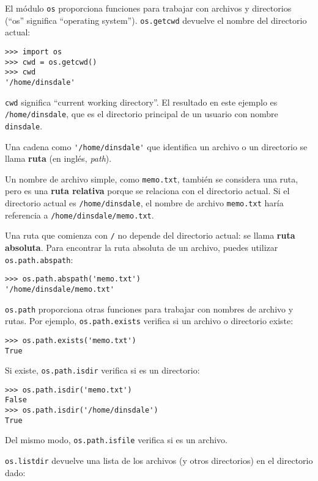 \documentclass[10pt]{book}
\begin{document}
El módulo {\tt os} proporciona funciones para trabajar con archivos y
directorios (``os'' significa ``operating system'').  {\tt os.getcwd}
devuelve el nombre del directorio actual:

\begin{verbatim}
>>> import os
>>> cwd = os.getcwd()
>>> cwd
'/home/dinsdale'
\end{verbatim}
%
{\tt cwd} significa ``current working directory''.  El resultado en
este ejemplo es {\tt /home/dinsdale}, que es el directorio principal de un
usuario con nombre {\tt dinsdale}.

Una cadena como \verb"'/home/dinsdale'" que identifica un archivo o un
directorio se llama {\bf ruta} (en inglés, {\em path}).

Un nombre de archivo simple, como {\tt memo.txt}, también se considera una ruta,
pero es una {\bf ruta relativa} porque se relaciona con el directorio
actual.  Si el directorio actual es {\tt /home/dinsdale}, el
nombre de archivo {\tt memo.txt} haría referencia a {\tt /home/dinsdale/memo.txt}.
 
 

Una ruta que comienza con {\tt /} no depende del directorio
actual: se llama {\bf ruta absoluta}.  Para encontrar la ruta
absoluta de un archivo, puedes utilizar {\tt os.path.abspath}:

\begin{verbatim}
>>> os.path.abspath('memo.txt')
'/home/dinsdale/memo.txt'
\end{verbatim}
%
{\tt os.path} proporciona otras funciones para trabajar con nombres de archivo
y rutas.  Por ejemplo,
{\tt os.path.exists} verifica
si un archivo o directorio existe:

\begin{verbatim}
>>> os.path.exists('memo.txt')
True
\end{verbatim}
%
Si existe, {\tt os.path.isdir} verifica si es un directorio:

\begin{verbatim}
>>> os.path.isdir('memo.txt')
False
>>> os.path.isdir('/home/dinsdale')
True
\end{verbatim}
%
Del mismo modo, {\tt os.path.isfile} verifica si es un archivo.

{\tt os.listdir} devuelve una lista de los archivos (y otros directorios)
en el directorio dado:
\end{document}
